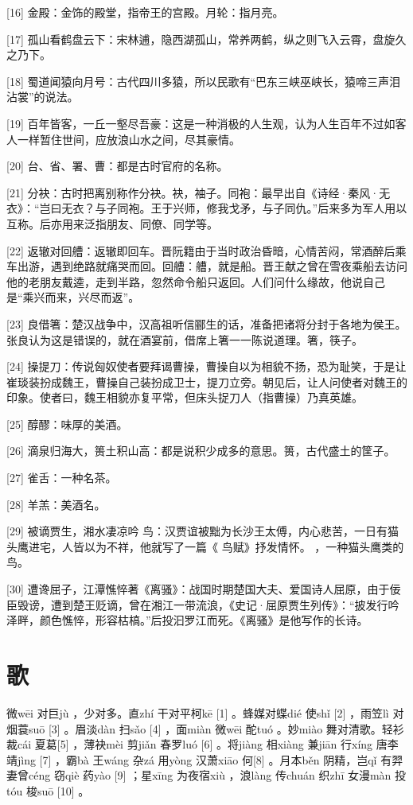\documentclass[12pt,UTF8]{ctexbook}
\begin{document}
[16] 金殿：金饰的殿堂，指帝王的宫殿。月轮：指月亮。

[17] 孤山看鹤盘云下：宋林逋，隐西湖孤山，常养两鹤，纵之则飞入云霄，盘旋久之乃下。

[18] 蜀道闻猿向月号：古代四川多猿，所以民歌有“巴东三峡巫峡长，猿啼三声泪沾裳”的说法。

[19] 百年皆客，一丘一壑尽吾豪：这是一种消极的人生观，认为人生百年不过如客人一样暂住世间，应放浪山水之间，尽其豪情。

[20] 台、省、署、曹：都是古时官府的名称。

[21] 分袂：古时把离别称作分袂。袂，袖子。同袍：最早出自《诗经·秦风·无衣》：“岂曰无衣？与子同袍。王于兴师，修我戈矛，与子同仇。”后来多为军人用以互称。后亦用来泛指朋友、同僚、同学等。

[22] 返辙对回艚：返辙即回车。晋阮籍由于当时政治昏暗，心情苦闷，常酒醉后乘车出游，遇到绝路就痛哭而回。回艚：艚，就是船。晋王献之曾在雪夜乘船去访问他的老朋友戴逵，走到半路，忽然命令船只返回。人们问什么缘故，他说自己是“乘兴而来，兴尽而返”。

[23] 良借箸：楚汉战争中，汉高祖听信郦生的话，准备把诸将分封于各地为侯王。张良认为这是错误的，就在酒宴前，借席上箸一一陈说道理。箸，筷子。

[24] 操提刀：传说匈奴使者要拜谒曹操，曹操自以为相貌不扬，恐为耻笑，于是让崔琰装扮成魏王，曹操自己装扮成卫士，提刀立旁。朝见后，让人问使者对魏王的印象。使者曰，魏王相貌亦复平常，但床头捉刀人（指曹操）乃真英雄。

[25] 醇醪：味厚的美酒。

[26] 滴泉归海大，篑土积山高：都是说积少成多的意思。篑，古代盛土的筐子。

[27] 雀舌：一种名茶。

[28] 羊羔：美酒名。

[29] 被谪贾生，湘水凄凉吟 鸟：汉贾谊被黜为长沙王太傅，内心悲苦，一日有猫头鹰进宅，人皆以为不祥，他就写了一篇《 鸟赋》抒发情怀。 ，一种猫头鹰类的鸟。

[30] 遭谗屈子，江潭憔悴著《离骚》：战国时期楚国大夫、爱国诗人屈原，由于佞臣毁谤，遭到楚王贬谪，曾在湘江一带流浪，《史记·屈原贾生列传》：“披发行吟泽畔，颜色憔悴，形容枯槁。”后投汩罗江而死。《离骚》是他写作的长诗。





\chapter{歌}


微wēi 对巨jù ，少对多。直zhí 干对平柯kē [1] 。蜂媒对蝶dié 使shǐ [2] ，雨笠lì 对烟蓑suō [3] 。眉淡dàn 扫sǎo [4] ，面miàn 微wēi 酡tuó 。妙miào 舞对清歌。轻衫裁cái 夏葛[5] ，薄袂mèi 剪jiǎn 春罗luó [6] 。将jiàng 相xiàng 兼jiān 行xíng 唐李靖jìng [7] ，霸bà 王wáng 杂zá 用yòng 汉萧xiāo 何[8] 。月本běn 阴精，岂qǐ 有羿妻曾céng 窃qiè 药yào [9] ；星xīng 为夜宿xiù ，浪làng 传chuán 织zhī 女漫màn 投tóu 梭suō [10] 。
\end{document}
